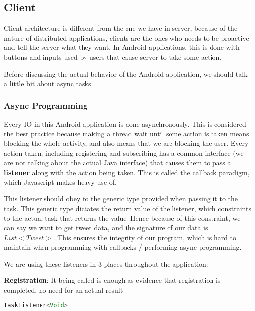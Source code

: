 \documentclass{article}
\begin{document}
\subsection{Client}
\label{client}
Client architecture is different from the one we have in server, because of the nature of distributed applications, clients are the ones who needs to be proactive and tell the server what they want. In Android applications, this is done with buttons and inputs used by users that cause server to take some action.

\par Before discussing the actual behavior of the Android application, we should talk a little bit about async tasks. 

\newpage 

\subsubsection{Async Programming}
\label{async_programming}

\par Every IO in this Android application is done asynchronously. This is considered the best practice because making a thread wait until some action is taken means blocking the whole activity, and also means that we are blocking the user. Every action taken, including registering and subscribing has a common interface (we are not talking about the actual Java interface) that causes them to pass a \textbf{listener} along with the action being taken. This is called the callback paradigm, which Javascript makes heavy use of.

\par This listener should obey to the generic type provided when passing it to the task. This generic type dictates the return value of the listener, which constraints to the actual task that returns the value. Hence because of this constraint, we can say we want to get tweet data, and the signature of our data is $List<Tweet>$. This ensures the integrity of our program, which is hard to maintain when programming with callbacks / performing async programming.

\par We are using these listeners in 3 places throughout the application: \\

\par \textbf{Registration}: It being called is enough as evidence that registration is completed, no need for an actual result
\begin{lstlisting}[firstline=1, language=Java]
TaskListener<Void>
\end{lstlisting}
\end{document}
